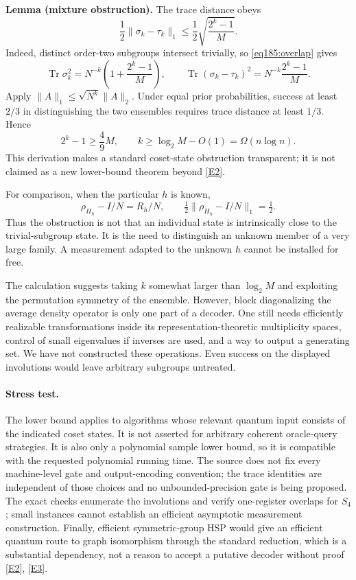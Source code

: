 \documentclass[11pt,a4paper]{article}
\newcommand{\eref}[2]{\hyperlink{extra:#1:#2}{[E#2]}}
\numberwithin{equation}{section}
\begin{document}
\textbf{Lemma (mixture obstruction).} The trace distance obeys
\begin{equation}\label{eq185:distance}
 \frac12\|\sigma_k-\tau_k\|_1
 \le\frac12\sqrt{\frac{2^k-1}{M}}.
\end{equation}
Indeed, distinct order-two subgroups intersect trivially, so \eqref{eq185:overlap} gives
\[
 \operatorname{Tr}\sigma_k^2=N^{-k}\left(1+\frac{2^k-1}{M}\right),
 \qquad
 \operatorname{Tr}(\sigma_k-\tau_k)^2=N^{-k}\frac{2^k-1}{M}.
\]
Apply $\|A\|_1\le\sqrt{N^k}\|A\|_2$. Under equal prior probabilities, success at least $2/3$ in distinguishing the two ensembles requires trace distance at least $1/3$. Hence
\[
 2^k-1\ge\frac49M,\qquad
 k\ge\log_2M-O(1)=\Omega(n\log n).
\]
This derivation makes a standard coset-state obstruction transparent; it is not claimed as a new lower-bound theorem beyond \eref{30006778}{2}.

For comparison, when the particular $h$ is known,
\[
 \rho_{H_h}-I/N=R_h/N,
 \qquad \tfrac12\|\rho_{H_h}-I/N\|_1=\tfrac12.
\]
Thus the obstruction is not that an individual state is intrinsically close to the trivial-subgroup state. It is the need to distinguish an unknown member of a very large family. A measurement adapted to the unknown $h$ cannot be installed for free.

The calculation suggests taking $k$ somewhat larger than $\log_2M$ and exploiting the permutation symmetry of the ensemble. However, block diagonalizing the average density operator is only one part of a decoder. One still needs efficiently realizable transformations inside its representation-theoretic multiplicity spaces, control of small eigenvalues if inverses are used, and a way to output a generating set. We have not constructed these operations. Even success on the displayed involutions would leave arbitrary subgroups untreated.

\paragraph{Stress test.}
The lower bound applies to algorithms whose relevant quantum input consists of the indicated coset states. It is not asserted for arbitrary coherent oracle-query strategies. It is also only a polynomial sample lower bound, so it is compatible with the requested polynomial running time. The source does not fix every machine-level gate and output-encoding convention; the trace identities are independent of those choices and no unbounded-precision gate is being proposed. The exact checks enumerate the involutions and verify one-register overlaps for $S_4$; small instances cannot establish an efficient asymptotic measurement construction. Finally, efficient symmetric-group HSP would give an efficient quantum route to graph isomorphism through the standard reduction, which is a substantial dependency, not a reason to accept a putative decoder without proof \eref{30006778}{2}, \eref{30006778}{3}.
\end{document}
